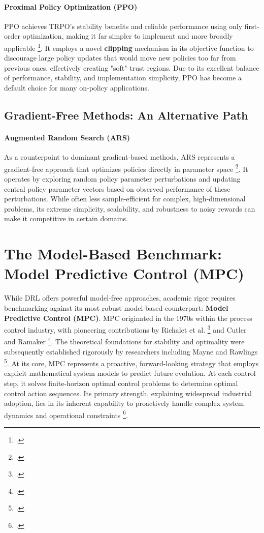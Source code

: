 \paragraph{Proximal Policy Optimization (PPO)}

PPO achieves TRPO's stability benefits and reliable performance using only first-order optimization, making it far simpler to implement and more broadly applicable \footcite{schulman2017proximal}. It employs a novel \textbf{clipping} mechanism in its objective function to discourage large policy updates that would move new policies too far from previous ones, effectively creating "soft" trust regions. Due to its excellent balance of performance, stability, and implementation simplicity, PPO has become a default choice for many on-policy applications.

\subsection{Gradient-Free Methods: An Alternative Path}

\paragraph{Augmented Random Search (ARS)}

As a counterpoint to dominant gradient-based methods, ARS represents a gradient-free approach that optimizes policies directly in parameter space \footcite{mania2018simple}. It operates by exploring random policy parameter perturbations and updating central policy parameter vectors based on observed performance of these perturbations. While often less sample-efficient for complex, high-dimensional problems, its extreme simplicity, scalability, and robustness to noisy rewards can make it competitive in certain domains.

\section{The Model-Based Benchmark: Model Predictive Control (MPC)}

While DRL offers powerful model-free approaches, academic rigor requires benchmarking against its most robust model-based counterpart: \textbf{Model Predictive Control (MPC)}. MPC originated in the 1970s within the process control industry, with pioneering contributions by Richalet et al. \footcite{Richalet1978ModelPH} and Cutler and Ramaker \footcite{Cutler1980}. The theoretical foundations for stability and optimality were subsequently established rigorously by researchers including Mayne and Rawlings \footcite{mayne2000constraine}.
\noindent
At its core, MPC represents a proactive, forward-looking strategy that employs explicit mathematical system models to predict future evolution. At each control step, it solves finite-horizon optimal control problems to determine optimal control action sequences. Its primary strength, explaining widespread industrial adoption, lies in its inherent capability to proactively handle complex system dynamics and operational constraints \footcite{minchala2025systematic}.

